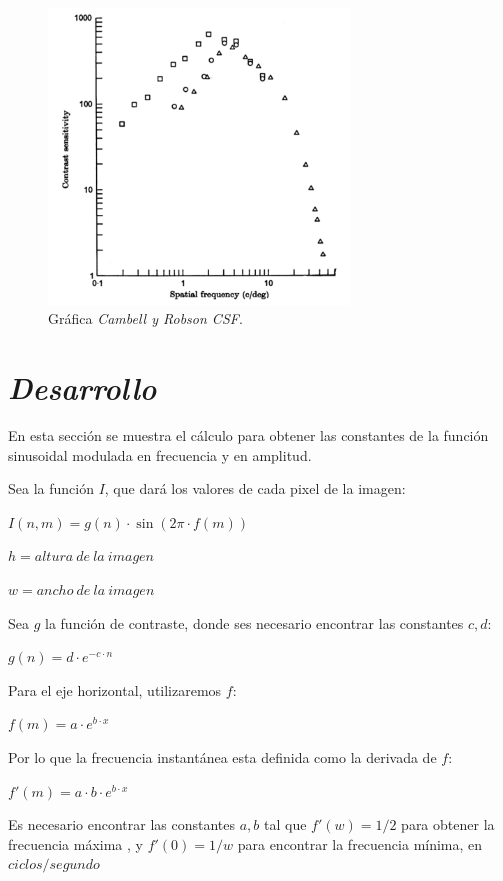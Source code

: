 \documentclass[conference]{IEEEtran}
\begin{document}
\begin{figure}[htbp]
\centerline{\includegraphics[width=80mm]{code/campbellGrafica}}
\caption{Gráfica \textit{Cambell y Robson CSF}.}
\label{campbellGrafica}
\end{figure}

\section{\textit{Desarrollo}}

En esta sección se muestra el cálculo para obtener las constantes de la función sinusoidal modulada en frecuencia y en amplitud.

Sea la función $I$, que dará los valores de cada pixel de la imagen:

$I(n,m) = g(n)\cdot \sin(2\pi\cdot f(m))$

$h = altura\ de\ la\ imagen$

$w =  ancho\ de\ la\ imagen$

Sea $g$ la función de contraste, donde ses necesario encontrar las constantes $c,d$:

$g(n)=d\cdot e^{-c\cdot n}$

Para el eje horizontal, utilizaremos $f$:

$f(m) = a\cdot e^{b\cdot x}$

Por lo que la frecuencia instantánea esta definida como la derivada de $f$:

$f'(m) = a\cdot b\cdot e^{b\cdot x}$

Es necesario encontrar las constantes $a,b$ tal que $f'(w) = 1/2$ para obtener la frecuencia máxima , y $f'(0) = 1/w$ para encontrar la frecuencia mínima, en $ciclos/segundo$
\end{document}
